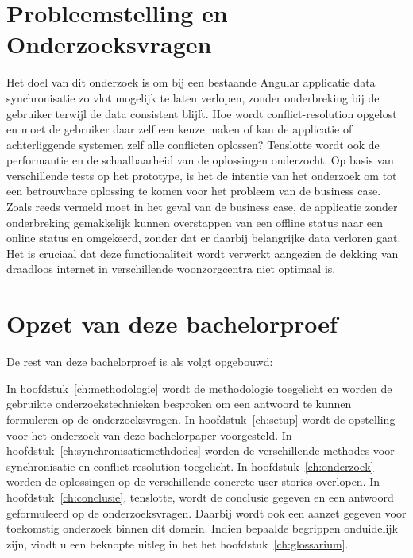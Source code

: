 \section{Probleemstelling en Onderzoeksvragen}
\label{sec:onderzoeksvragen}
Het doel van dit onderzoek is om bij een bestaande Angular applicatie data synchronisatie zo vlot mogelijk te laten verlopen, zonder onderbreking bij de gebruiker terwijl de data consistent blijft. Hoe wordt conflict-resolution opgelost en moet de gebruiker daar zelf een keuze maken of kan de applicatie of achterliggende systemen zelf alle conflicten oplossen? Tenslotte wordt ook de performantie en de schaalbaarheid van de oplossingen onderzocht. Op basis van verschillende tests op het prototype, is het de intentie van het onderzoek om tot een betrouwbare oplossing te komen voor het probleem van de business case. Zoals reeds vermeld moet in het geval van de business case, de applicatie zonder onderbreking gemakkelijk kunnen overstappen van een offline status naar een online status en omgekeerd, zonder dat er daarbij belangrijke data verloren gaat. Het is cruciaal dat deze functionaliteit wordt verwerkt aangezien de dekking van draadloos internet in verschillende woonzorgcentra niet optimaal is.

\section{Opzet van deze bachelorproef}
\label{sec:opzet-bachelorproef}


De rest van deze bachelorproef is als volgt opgebouwd:

In hoofdstuk~\ref{ch:methodologie} wordt de methodologie toegelicht en worden de gebruikte onderzoekstechnieken besproken om een antwoord te kunnen formuleren op de onderzoeksvragen.
In hoofdstuk~\ref{ch:setup} wordt de opstelling voor het onderzoek van deze bachelorpaper voorgesteld.
In hoofdstuk~\ref{ch:synchronisatiemethdodes} worden de verschillende methodes voor synchronisatie en conflict resolution toegelicht.
In hoofdstuk~\ref{ch:onderzoek} worden de oplossingen op de verschillende concrete user stories overlopen.
In hoofdstuk~\ref{ch:conclusie}, tenslotte, wordt de conclusie gegeven en een antwoord geformuleerd op de onderzoeksvragen. Daarbij wordt ook een aanzet gegeven voor toekomstig onderzoek binnen dit domein.
Indien bepaalde begrippen onduidelijk zijn, vindt u een beknopte uitleg in het het hoofdstuk~\ref{ch:glossarium}.

